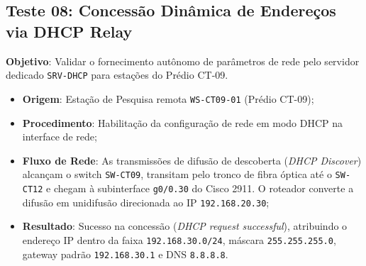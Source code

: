 \subsection{Teste 08: Concessão Dinâmica de Endereços via DHCP Relay}
\textbf{Objetivo}: Validar o fornecimento autônomo de parâmetros de rede pelo servidor dedicado \texttt{SRV-DHCP} para estações do Prédio CT-09.
\begin{itemize}
    \item \textbf{Origem}: Estação de Pesquisa remota \texttt{WS-CT09-01} (Prédio CT-09);
    \item \textbf{Procedimento}: Habilitação da configuração de rede em modo DHCP na interface de rede;
    \item \textbf{Fluxo de Rede}: As transmissões de difusão de descoberta (\textit{DHCP Discover}) alcançam o switch \texttt{SW-CT09}, transitam pelo tronco de fibra óptica até o \texttt{SW-CT12} e chegam à subinterface \texttt{g0/0.30} do Cisco 2911. O roteador converte a difusão em unidifusão direcionada ao IP \texttt{192.168.20.30};
    \item \textbf{Resultado}: Sucesso na concessão (\textit{DHCP request successful}), atribuindo o endereço IP dentro da faixa \texttt{192.168.30.0/24}, máscara \texttt{255.255.255.0}, gateway padrão \texttt{192.168.30.1} e DNS \texttt{8.8.8.8}.
\end{itemize}
